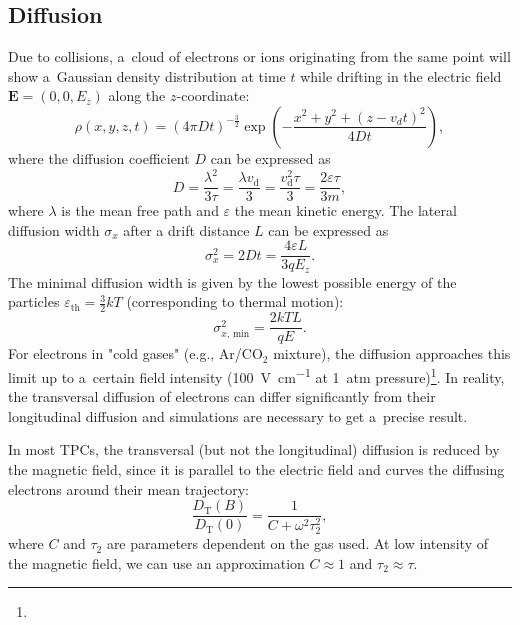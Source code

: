		\subsection{Diffusion}
			Due to collisions, a~cloud of electrons or ions originating from the same point will show a~Gaussian density distribution at time $t$ while drifting in the electric field $\mathbf{E} = (0,0,E_z)$ along the $z$\nobreakdash-coordinate:
				\begin{equation}
					\rho(x,y,z,t) = (4\pi Dt)^{-\frac{3}{2}} \exp\left(-\frac{x^2+y^2+(z-v_dt)^2}{4Dt}\right),
				\end{equation}
			where the diffusion coefficient $D$ can be expressed as
				\begin{equation}
					D = \frac{\lambda^2}{3\tau} = \frac{\lambda v_\text{d}}{3} = \frac{v_\text{d}^2\tau}{3} = \frac{2\varepsilon\tau}{3m},
				\end{equation}
			where $\lambda$ is the mean free path and $\varepsilon$ the mean kinetic energy. The lateral diffusion width $\sigma_x$ after a drift distance $L$ can be expressed as
				\begin{equation}
					\sigma_x^2 = 2Dt = \frac{4\varepsilon L}{3qE_z}.
				\end{equation}
			The minimal diffusion width is given by the lowest possible energy of the particles $\varepsilon_\text{th} = \frac{3}{2}kT$ (corresponding to thermal motion):
				\begin{equation}
					\sigma_{x, \,\text{min}}^2 = \frac{2kTL}{qE}.
				\end{equation}
			For electrons in "cold gases" (e.g., Ar/CO$_2$ mixture), the diffusion approaches this limit up to a~certain field intensity (\textapprox\qty{100}{\V\per\cm} at 1~atm pressure)\footnote{}. In reality, the transversal diffusion of electrons can differ significantly from their longitudinal diffusion and simulations are necessary to get a~precise result.
			
			In most \acp{TPC}, the transversal (but not the longitudinal) diffusion is reduced by the magnetic field, since it is parallel to the electric field and curves the diffusing electrons around their mean trajectory:
				\begin{equation}
					\label{eq:difmag}
					\frac{D_\text{T}(B)}{D_\text{T}(0)} = \frac{1}{C+\omega^2\tau_2^2},
				\end{equation}
			where $C$ and $\tau_2$ are parameters dependent on the gas used. At low intensity of the magnetic field, we can use an approximation $C\approx1$ and $\tau_2\approx\tau$.
			
